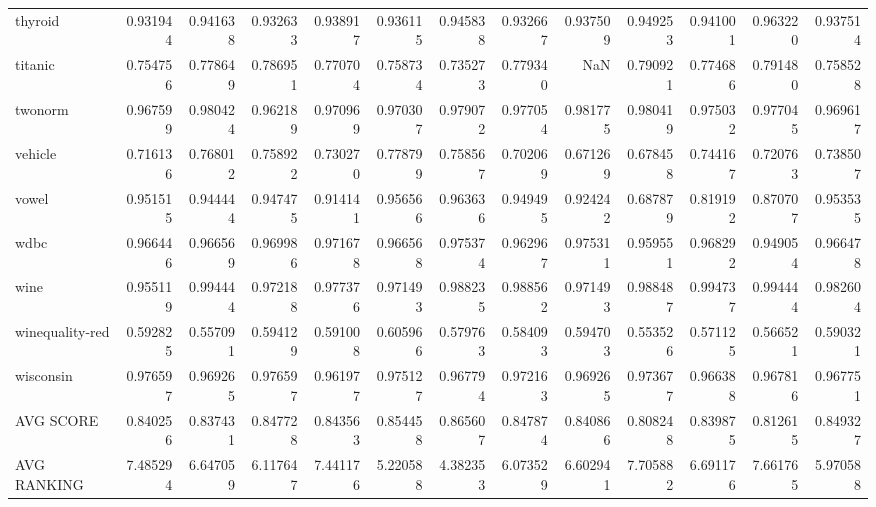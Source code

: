 \begin{tabular}{lrrrrrrrrrrrr}
thyroid         &   0.931944 &  0.941638 &  0.932633 &  0.938917 &  0.936115 &  0.945838 &  0.932667 &  0.937509 &  0.949253 &  0.941001 &  0.963220 &  0.937514 \\
titanic         &   0.754756 &  0.778649 &  0.786951 &  0.770704 &  0.758734 &  0.735273 &  0.779340 &       NaN &  0.790921 &  0.774686 &  0.791480 &  0.758528 \\
twonorm         &   0.967599 &  0.980424 &  0.962189 &  0.970969 &  0.970307 &  0.979072 &  0.977054 &  0.981775 &  0.980419 &  0.975032 &  0.977045 &  0.969617 \\
vehicle         &   0.716136 &  0.768012 &  0.758922 &  0.730270 &  0.778799 &  0.758567 &  0.702069 &  0.671269 &  0.678458 &  0.744167 &  0.720763 &  0.738507 \\
vowel           &   0.951515 &  0.944444 &  0.947475 &  0.914141 &  0.956566 &  0.963636 &  0.949495 &  0.924242 &  0.687879 &  0.819192 &  0.870707 &  0.953535 \\
wdbc            &   0.966446 &  0.966569 &  0.969986 &  0.971678 &  0.966568 &  0.975374 &  0.962967 &  0.975311 &  0.959551 &  0.968292 &  0.949054 &  0.966478 \\
wine            &   0.955119 &  0.994444 &  0.972188 &  0.977376 &  0.971493 &  0.988235 &  0.988562 &  0.971493 &  0.988487 &  0.994737 &  0.994444 &  0.982604 \\
winequality-red &   0.592825 &  0.557091 &  0.594129 &  0.591008 &  0.605966 &  0.579763 &  0.584093 &  0.594703 &  0.553526 &  0.571125 &  0.566521 &  0.590321 \\
wisconsin       &   0.976597 &  0.969265 &  0.976597 &  0.961977 &  0.975127 &  0.967794 &  0.972163 &  0.969265 &  0.973677 &  0.966388 &  0.967816 &  0.967751 \\
AVG SCORE       &   0.840256 &  0.837431 &  0.847728 &  0.843563 &  0.854458 &  0.865607 &  0.847874 &  0.840866 &  0.808248 &  0.839875 &  0.812615 &  0.849327 \\
AVG RANKING     &   7.485294 &  6.647059 &  6.117647 &  7.441176 &  5.220588 &  4.382353 &  6.073529 &  6.602941 &  7.705882 &  6.691176 &  7.661765 &  5.970588 \\
\bottomrule
\end{tabular}
